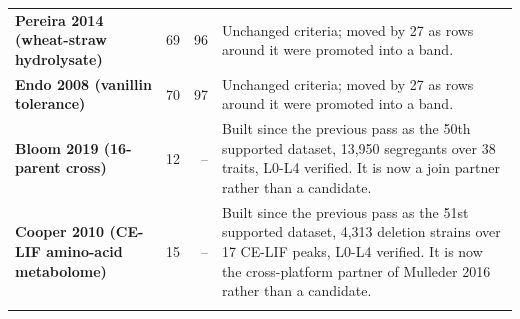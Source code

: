 \begin{longtable}{@{}L{46mm} r@{\hspace{6pt}} r@{\hspace{6pt}} L{104mm}@{}}
\addlinespace[5pt]
\textbf{Pereira 2014 (wheat-straw hydrolysate)} & 69 & 96 & Unchanged criteria; moved by 27 as rows around it were promoted into a band. \\
\addlinespace[5pt]
\textbf{Endo 2008 (vanillin tolerance)} & 70 & 97 & Unchanged criteria; moved by 27 as rows around it were promoted into a band. \\
\addlinespace[5pt]
\textbf{Bloom 2019 (16-parent cross)} & 12 & -- & Built since the previous pass as the 50th supported dataset, 13,950 segregants over 38 traits, L0-L4 verified. It is now a join partner rather than a candidate. \\
\addlinespace[5pt]
\textbf{Cooper 2010 (CE-LIF amino-acid metabolome)} & 15 & -- & Built since the previous pass as the 51st supported dataset, 4,313 deletion strains over 17 CE-LIF peaks, L0-L4 verified. It is now the cross-platform partner of Mulleder 2016 rather than a candidate. \\
\addlinespace[5pt]
\end{longtable}
\endgroup
